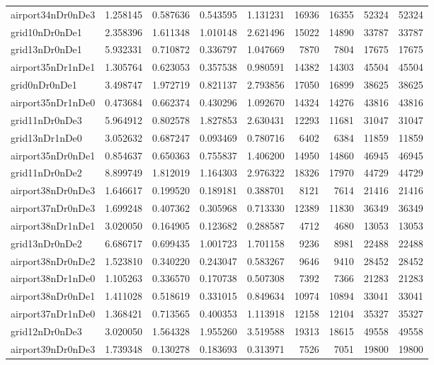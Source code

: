 \begin{longtable}{|l|r|r|r|r|r|r|r|r|}
airport34nDr0nDe3 & 1.258145 & 0.587636 & 0.543595 & 1.131231 & 16936 & 16355 & 52324 & 52324 \\
grid10nDr0nDe1 & 2.358396 & 1.611348 & 1.010148 & 2.621496 & 15022 & 14890 & 33787 & 33787 \\
grid13nDr0nDe1 & 5.932331 & 0.710872 & 0.336797 & 1.047669 & 7870 & 7804 & 17675 & 17675 \\
airport35nDr1nDe1 & 1.305764 & 0.623053 & 0.357538 & 0.980591 & 14382 & 14303 & 45504 & 45504 \\
grid0nDr0nDe1 & 3.498747 & 1.972719 & 0.821137 & 2.793856 & 17050 & 16899 & 38625 & 38625 \\
airport35nDr1nDe0 & 0.473684 & 0.662374 & 0.430296 & 1.092670 & 14324 & 14276 & 43816 & 43816 \\
grid11nDr0nDe3 & 5.964912 & 0.802578 & 1.827853 & 2.630431 & 12293 & 11681 & 31047 & 31047 \\
grid13nDr1nDe0 & 3.052632 & 0.687247 & 0.093469 & 0.780716 & 6402 & 6384 & 11859 & 11859 \\
airport35nDr0nDe1 & 0.854637 & 0.650363 & 0.755837 & 1.406200 & 14950 & 14860 & 46945 & 46945 \\
grid11nDr0nDe2 & 8.899749 & 1.812019 & 1.164303 & 2.976322 & 18326 & 17970 & 44729 & 44729 \\
airport38nDr0nDe3 & 1.646617 & 0.199520 & 0.189181 & 0.388701 & 8121 & 7614 & 21416 & 21416 \\
airport37nDr0nDe3 & 1.699248 & 0.407362 & 0.305968 & 0.713330 & 12389 & 11830 & 36349 & 36349 \\
airport38nDr1nDe1 & 3.020050 & 0.164905 & 0.123682 & 0.288587 & 4712 & 4680 & 13053 & 13053 \\
grid13nDr0nDe2 & 6.686717 & 0.699435 & 1.001723 & 1.701158 & 9236 & 8981 & 22488 & 22488 \\
airport38nDr0nDe2 & 1.523810 & 0.340220 & 0.243047 & 0.583267 & 9646 & 9410 & 28452 & 28452 \\
airport38nDr1nDe0 & 1.105263 & 0.336570 & 0.170738 & 0.507308 & 7392 & 7366 & 21283 & 21283 \\
airport38nDr0nDe1 & 1.411028 & 0.518619 & 0.331015 & 0.849634 & 10974 & 10894 & 33041 & 33041 \\
airport37nDr1nDe0 & 1.368421 & 0.713565 & 0.400353 & 1.113918 & 12158 & 12104 & 35327 & 35327 \\
grid12nDr0nDe3 & 3.020050 & 1.564328 & 1.955260 & 3.519588 & 19313 & 18615 & 49558 & 49558 \\
airport39nDr0nDe3 & 1.739348 & 0.130278 & 0.183693 & 0.313971 & 7526 & 7051 & 19800 & 19800 \\

\end{longtable}
